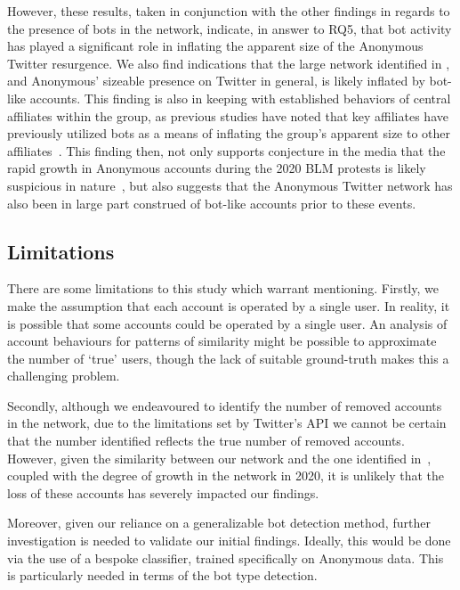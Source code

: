\documentclass[letterpaper]{article}
\begin{document}
However, these results, taken in conjunction with the other findings in regards to the presence of bots in the network, indicate, in answer to RQ5, that bot activity has played a significant role in inflating the apparent size of the Anonymous Twitter resurgence. We also find indications that the large network identified in \cite{Jones2020}, and Anonymous' sizeable presence on Twitter in general, is likely inflated by bot-like accounts. This finding is also in keeping with established behaviors of central affiliates within the group, as previous studies have noted that key affiliates have previously utilized bots as a means of inflating the group's apparent size to other affiliates~\cite{Olson2013}. This finding then, not only supports conjecture in the media that the rapid growth in Anonymous accounts during the 2020 BLM protests is likely suspicious in nature~\cite{Telegraph2020}, but also suggests that the Anonymous Twitter network has also been in large part construed of bot-like accounts prior to these events.

\vspace{-1.51mm}
\subsection{Limitations}

There are some limitations to this study which warrant mentioning. Firstly, we make the assumption that each account is operated by a single user. In reality, it is possible that some accounts could be operated by a single user. An analysis of account behaviours for patterns of similarity might be possible to approximate the number of `true' users, though the lack of suitable ground-truth makes this a challenging problem.

Secondly, although we endeavoured to identify the number of removed accounts in the network, due to the limitations set by Twitter's API we cannot be certain that the number identified reflects the true number of removed accounts. However, given the similarity between our network and the one identified in~\cite{Jones2020}, coupled with the degree of growth in the network in 2020, it is unlikely that the loss of these accounts has severely impacted our findings.

Moreover, given our reliance on a generalizable bot detection method, further investigation is needed to validate our initial findings. Ideally, this would be done via the use of a bespoke classifier, trained specifically on Anonymous data. This is particularly needed in terms of the bot type detection.
\end{document}

